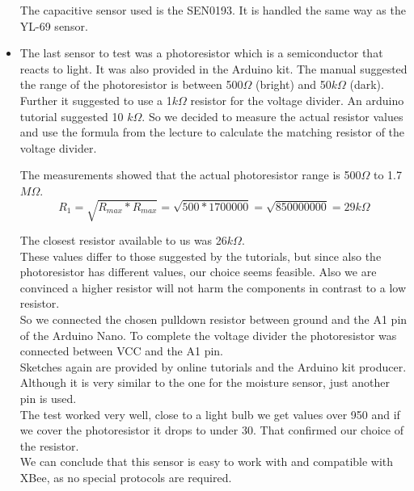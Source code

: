\begin{itemize}
The capacitive sensor used is the SEN0193. It is handled the same way as the YL-69 sensor.




\item
The last sensor to test was a photoresistor which is a semiconductor that reacts to light. It was also provided in the Arduino kit. The manual suggested the range of the photoresistor is between 500$\Omega$ (bright) and 50$k\Omega$ (dark). 
Further it suggested to use a 1$k\Omega$ resistor for the voltage divider. An arduino tutorial \citep{misc:photoresistor_tutorial} suggested 10 $k\Omega$. So we decided to measure the actual resistor values and use the formula from the lecture to calculate the matching resistor of the voltage divider. %

The measurements showed that the actual photoresistor range is 500$\Omega$ to 1.7$M\Omega$.\\
\begin{equation}
R_1 = \sqrt{R_{max}*R_{max}} = \sqrt{500*1700000} = \sqrt{850000000} = 29k\Omega
\end{equation}


The closest resistor available to us was 26$k\Omega$.\\
These values differ to those suggested by the tutorials, but since also the photoresistor has different values, our choice seems feasible. Also we are convinced a higher resistor will not harm the components in contrast to a low resistor.\\
So we connected the chosen pulldown resistor between ground and the A1 pin of the Arduino Nano. To complete the voltage divider the photoresistor was connected between VCC and the A1 pin.\\

Sketches again are provided by online tutorials and the Arduino kit producer. Although it is very similar to the one for the moisture sensor, just another pin is used.\\

The test worked very well, close to a light bulb we get values over 950 and if we cover the photoresistor it drops to under 30. That confirmed our choice of the resistor.\\

We can conclude that this sensor is easy to work with and compatible with XBee, as no special protocols are required.

\end{itemize}


